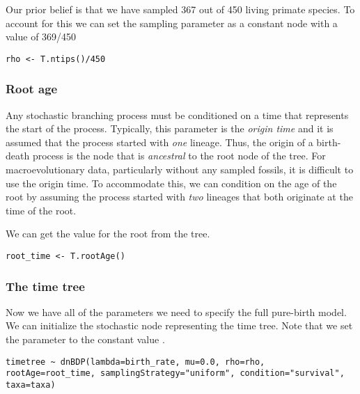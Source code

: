 Our prior belief is that we have sampled 367 out of 450 living primate species. 
To account for this we can set the sampling parameter as a constant node with a value of 369/450
{\tt \begin{snugshade*}
\begin{lstlisting}
rho <- T.ntips()/450
\end{lstlisting}
\end{snugshade*}}


\subsubsection{Root age}

Any stochastic branching process must be conditioned on a time that represents the start of the process. 
Typically, this parameter is the \textit{origin time} and it is assumed that the process started with \textit{one} lineage. 
Thus, the origin of a birth-death process is the node that is \textit{ancestral} to the root node of the tree.
For macroevolutionary data, particularly without any sampled fossils, it is difficult to use the origin time.
To accommodate this, we can condition on the age of the root by assuming the process started with \textit{two} lineages that both originate at the time of the root.

We can get the value for the root from the \citet{Springer2012} tree.

{\tt \begin{snugshade*}
\begin{lstlisting}
root_time <- T.rootAge()
\end{lstlisting}
\end{snugshade*}}

\subsubsection{The time tree}

Now we have all of the parameters we need to specify the full pure-birth model. 
We can initialize the stochastic node representing the time tree.
Note that we set the  parameter to the constant value .
{\tt \begin{snugshade*}
\begin{lstlisting}
timetree ~ dnBDP(lambda=birth_rate, mu=0.0, rho=rho, rootAge=root_time, samplingStrategy="uniform", condition="survival", taxa=taxa)
\end{lstlisting}
\end{snugshade*}}

